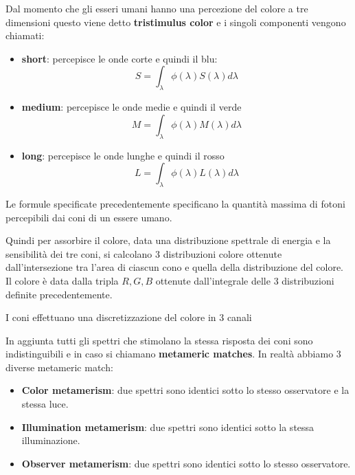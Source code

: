 Dal momento che gli esseri umani hanno una percezione del colore a tre dimensioni
questo viene detto \textbf{tristimulus color} e i singoli componenti vengono chiamati:
\begin{itemize}
    \item \textbf{short}: percepisce le onde corte e quindi il blu:
          \begin{equation*}
              S = \int_{\lambda} \phi(\lambda) S(\lambda)d\lambda
          \end{equation*}
    \item \textbf{medium}: percepisce le onde medie e quindi il verde
          \begin{equation*}
              M = \int_{\lambda} \phi(\lambda) M(\lambda)d\lambda
          \end{equation*}
    \item \textbf{long}: percepisce le onde lunghe e quindi il rosso
          \begin{equation*}
              L = \int_{\lambda} \phi(\lambda) L(\lambda)d\lambda
          \end{equation*}
\end{itemize}

Le formule specificate precedentemente specificano la quantità massima di fotoni
percepibili dai coni di un essere umano.

Quindi per assorbire il colore, data una distribuzione spettrale di energia e
la sensibilità dei tre coni, si calcolano $3$ distribuzioni colore ottenute dall'intersezione
tra l'area di ciascun cono e quella della distribuzione del colore. Il colore è
data dalla tripla $R,G,B$  ottenute dall'integrale delle $3$ distribuzioni definite
precedentemente.

\begin{nota}
    I coni effettuano una discretizzazione del colore in $3$ canali
\end{nota}

In aggiunta tutti gli spettri che stimolano la stessa risposta dei coni sono
indistinguibili e in caso si chiamano \textbf{metameric matches}. In realtà
abbiamo 3 diverse metameric match:
\begin{itemize}
    \item \textbf{Color metamerism}: due spettri sono identici sotto lo stesso
          osservatore e la stessa luce.
    \item \textbf{Illumination metamerism}: due spettri sono identici sotto la
          stessa illuminazione.
    \item \textbf{Observer metamerism}: due spettri sono identici sotto lo stesso
          osservatore.
\end{itemize}
